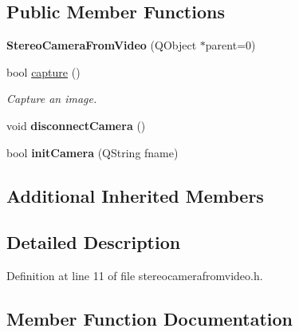 \subsection*{Public Member Functions}
\begin{DoxyCompactItemize}
\item 
\hypertarget{class_stereo_camera_from_video_ae98c29028ab573c2c6d1ddaa104595c9}{}{\bfseries Stereo\+Camera\+From\+Video} (Q\+Object $\ast$parent=0)\label{class_stereo_camera_from_video_ae98c29028ab573c2c6d1ddaa104595c9}

\item 
bool \hyperlink{class_stereo_camera_from_video_af53503df1755c0a9cf84718128ed0a5d}{capture} ()
\begin{DoxyCompactList}\small\item\em Capture an image. \end{DoxyCompactList}\item 
\hypertarget{class_stereo_camera_from_video_a1156dab0196f1366e95f82b3d197eb34}{}void {\bfseries disconnect\+Camera} ()\label{class_stereo_camera_from_video_a1156dab0196f1366e95f82b3d197eb34}

\item 
\hypertarget{class_stereo_camera_from_video_af52f8d11867223d927c6b0f18dd4cdcb}{}bool {\bfseries init\+Camera} (Q\+String fname)\label{class_stereo_camera_from_video_af52f8d11867223d927c6b0f18dd4cdcb}

\end{DoxyCompactItemize}
\subsection*{Additional Inherited Members}


\subsection{Detailed Description}


Definition at line 11 of file stereocamerafromvideo.\+h.



\subsection{Member Function Documentation}
\hypertarget{class_stereo_camera_from_video_af53503df1755c0a9cf84718128ed0a5d}{}
